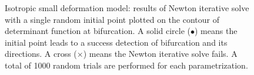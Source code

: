 \documentclass[12pt]{article}
\numberwithin{equation}{section}
\begin{document}
\begin{figure}[H]
   \centering {}   
   \caption{Isotropic small deformation model: results of Newton
   iterative solve with a single random initial point plotted on the
   contour of determinant function at bifurcation. A solid circle
   ($\bullet$) means the initial point leads to a success detection of
   bifurcation and its directions. A cross ($\times$) means the Newton
   iterative solve fails. A total of 1000 random trials are performed
   for each parametrization.}
   \label{fig:iso_shear_robust}
\end{figure}
\end{document}
